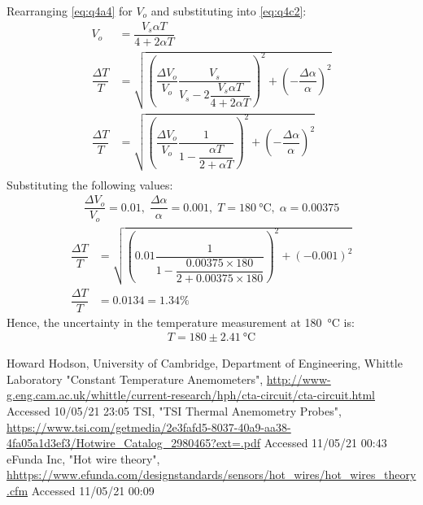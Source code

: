 \documentclass[11pt]{article}
\numberwithin{equation}{section}
\begin{document}
Rearranging \ref{eq:q4a4} for $V_o$ and substituting into \ref{eq:q4c2}:
\begin{align}
    V_o &= \dfrac{V_s \alpha T}{4+2\alpha T}\\
    \dfrac{\Delta T}{T} &= \sqrt{\left(\dfrac{\Delta V_o}{V_o}\dfrac{V_s}{V_s - 2\dfrac{V_s \alpha T}{4+2\alpha T}}\right)^2 + \left(-\dfrac{\Delta \alpha}{\alpha}\right)^2}\\
    \dfrac{\Delta T}{T} &= \sqrt{\left(\dfrac{\Delta V_o}{V_o}\dfrac{1}{1 - \dfrac{ \alpha T}{2+\alpha T}}\right)^2 + \left(-\dfrac{\Delta \alpha}{\alpha}\right)^2}\\
\end{align}
Substituting the following values:
\begin{gather}
    \dfrac{\Delta V_o}{V_o} = 0.01, \; \dfrac{\Delta \alpha}{\alpha} = 0.001, \; T = \SI{180}{\celsius}, \; \alpha = 0.00375
\end{gather}
\begin{align}
    \dfrac{\Delta T}{T} &= \sqrt{\left(0.01\dfrac{1}{1 - \dfrac{ 0.00375 \times 180}{2+0.00375 \times 180}}\right)^2 + \left(-0.001\right)^2}\\
    \dfrac{\Delta T}{T} &= 0.0134 = 1.34\%
\end{align}
Hence, the uncertainty in the temperature measurement at \SI{180}{\celsius} is:
\begin{align}
    T = 180\pm\SI{2.41}{\celsius} 
\end{align}
\begin{thebibliography}{00}
     Howard Hodson, University of Cambridge, Department of Engineering, Whittle Laboratory "Constant Temperature Anemometers", \url{http://www-g.eng.cam.ac.uk/whittle/current-research/hph/cta-circuit/cta-circuit.html} Accessed 10/05/21 23:05 
     TSI, "TSI Thermal Anemometry Probes", \url{https://www.tsi.com/getmedia/2e3fafd5-8037-40a9-aa38-4fa05a1d3ef3/Hotwire_Catalog_2980465?ext=.pdf} Accessed 11/05/21 00:43
     eFunda Inc, "Hot wire theory", \url{hhttps://www.efunda.com/designstandards/sensors/hot_wires/hot_wires_theory.cfm} Accessed 11/05/21 00:09
\end{thebibliography}
\end{document}
